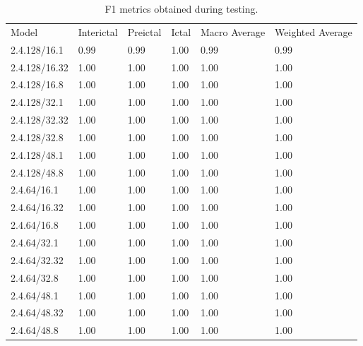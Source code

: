\documentclass[12pt]{article}
\begin{document}
\begin{table}[H]
\centering
\begin{tabular}{llllll}
Model & Interictal & Preictal & Ictal & Macro Average & Weighted Average \\
 2.4.128/16.1 & 0.99 & 0.99 & 1.00 & 0.99 & 0.99 \\
 2.4.128/16.32 & 1.00 & 1.00 & 1.00 & 1.00 & 1.00 \\
 2.4.128/16.8 & 1.00 & 1.00 & 1.00 & 1.00 & 1.00 \\
 2.4.128/32.1 & 1.00 & 1.00 & 1.00 & 1.00 & 1.00 \\
 2.4.128/32.32 & 1.00 & 1.00 & 1.00 & 1.00 & 1.00 \\
 2.4.128/32.8 & 1.00 & 1.00 & 1.00 & 1.00 & 1.00 \\
 2.4.128/48.1 & 1.00 & 1.00 & 1.00 & 1.00 & 1.00 \\
 2.4.128/48.8 & 1.00 & 1.00 & 1.00 & 1.00 & 1.00 \\
 2.4.64/16.1 & 1.00 & 1.00 & 1.00 & 1.00 & 1.00 \\
 2.4.64/16.32 & 1.00 & 1.00 & 1.00 & 1.00 & 1.00 \\
 2.4.64/16.8 & 1.00 & 1.00 & 1.00 & 1.00 & 1.00 \\
 2.4.64/32.1 & 1.00 & 1.00 & 1.00 & 1.00 & 1.00 \\
 2.4.64/32.32 & 1.00 & 1.00 & 1.00 & 1.00 & 1.00 \\
 2.4.64/32.8 & 1.00 & 1.00 & 1.00 & 1.00 & 1.00 \\
 2.4.64/48.1 & 1.00 & 1.00 & 1.00 & 1.00 & 1.00 \\
 2.4.64/48.32 & 1.00 & 1.00 & 1.00 & 1.00 & 1.00 \\
 2.4.64/48.8 & 1.00 & 1.00 & 1.00 & 1.00 & 1.00 \\
\end{tabular}
\caption{F1 metrics obtained during testing.}
\label{tab:f1-metrics}
\end{table}
\end{document}
